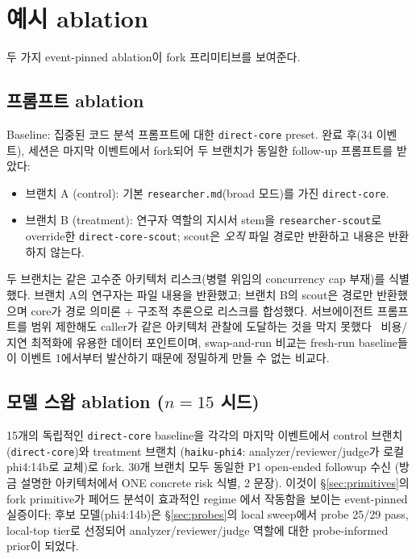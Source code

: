 \documentclass[11pt,a4paper]{article}
\begin{document}
\section{예시 ablation}
\label{sec:ablations}

두 가지 event-pinned ablation이 fork 프리미티브를 보여준다.

\subsection{프롬프트 ablation}

Baseline: 집중된 코드 분석 프롬프트에 대한 \texttt{direct-core} preset.
완료 후(34 이벤트), 세션은 마지막 이벤트에서 fork되어 두 브랜치가 동일한
follow-up 프롬프트를 받았다:

\begin{itemize}[leftmargin=*,itemsep=2pt,topsep=2pt]
\item 브랜치 A (control): 기본 \texttt{researcher.md}(broad 모드)를 가진
      \texttt{direct-core}.
\item 브랜치 B (treatment): 연구자 역할의 지시서 stem을
      \texttt{researcher-scout}로 override한 \texttt{direct-core-scout};
      scout은 \emph{오직} 파일 경로만 반환하고 내용은 반환하지 않는다.
\end{itemize}

두 브랜치는 같은 고수준 아키텍처 리스크(병렬 위임의 concurrency cap
부재)를 식별했다. 브랜치 A의 연구자는 파일 내용을 반환했고; 브랜치 B의
scout은 경로만 반환했으며 core가 경로 의미론 + 구조적 추론으로 리스크를
합성했다. 서브에이전트 프롬프트를 범위 제한해도 caller가 같은 아키텍처
관찰에 도달하는 것을 막지 못했다 \textemdash\ 비용/지연 최적화에 유용한
데이터 포인트이며, swap-and-run 비교는 fresh-run baseline들이 이벤트
1에서부터 발산하기 때문에 정밀하게 만들 수 없는 비교다.

\subsection{모델 스왑 ablation ($n=15$ 시드)}

15개의 독립적인 \texttt{direct-core} baseline을 각각의 마지막 이벤트에서
control 브랜치(\texttt{direct-core})와 treatment 브랜치
(\texttt{haiku-phi4}: analyzer/reviewer/judge가 로컬 phi4:14b로 교체)로
fork. 30개 브랜치 모두 동일한 P1 open-ended followup 수신 (방금 설명한
아키텍처에서 ONE concrete risk 식별, 2 문장). 이것이
\S\ref{sec:primitives}의 fork primitive가 페어드 분석이 효과적인 regime
에서 작동함을 보이는 event-pinned 실증이다; 후보 모델(phi4:14b)은
\S\ref{sec:probes}의 local sweep에서 probe 25/29 pass, local-top tier로
선정되어 analyzer/reviewer/judge 역할에 대한 probe-informed prior이
되었다.
\end{document}
